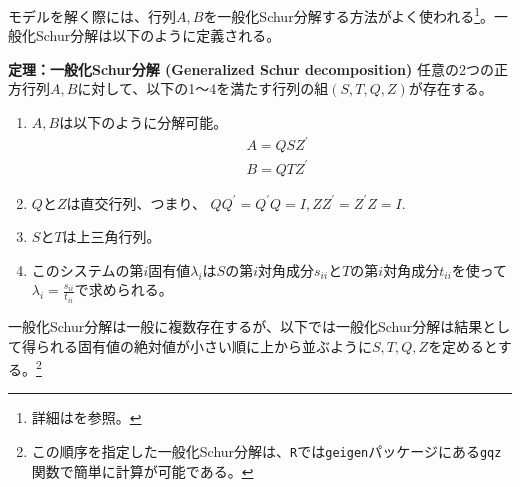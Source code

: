 \documentclass[a4j, dvipdfmx]{jarticle}
\begin{document}
モデルを解く際には、行列$A, B$を一般化Schur分解する方法がよく使われる\footnote{詳細は\citet{klein2000}を参照。}。一般化Schur分解は以下のように定義される。\\

\begin{itembox}[l]{{\bf 定理：一般化Schur分解 (Generalized Schur decomposition)}}
任意の2つの正方行列$A,B$に対して、以下の1～4を満たす行列の組$(S,T,Q,Z)$が存在する。
\begin{enumerate}
\item $A, B$は以下のように分解可能。
\begin{align}
&A = QSZ^\prime\\
&B = QTZ^\prime
\end{align}
\item $Q$と$Z$は直交行列、つまり、 \; $QQ^\prime = Q^\prime Q = I, ZZ^\prime = Z^\prime Z = I$.
\item $S$と$T$は上三角行列。
\item このシステムの第$i$固有値$\lambda_{i}$は$S$の第$i$対角成分$s_{ii}$と$T$の第$i$対角成分$t_{ii}$を使って$\lambda_i=\frac{s_{ii}}{t_{ii}}$で求められる。
\end{enumerate}
\end{itembox}
一般化Schur分解は一般に複数存在するが、以下では一般化Schur分解は結果として得られる固有値の絶対値が小さい順に上から並ぶように$S,T,Q,Z$を定めるとする。\footnote{この順序を指定した一般化Schur分解は、{\tt R}では{\tt geigen}パッケージにある{\tt gqz}関数で簡単に計算が可能である。}
\end{document}
